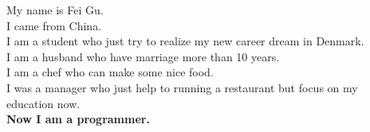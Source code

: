 
My name is Fei Gu.\\
I came from China.\\
I am a student who just try to realize my new career dream in Denmark.\\
I am a husband who have marriage more than 10 years.\\
I am a chef who can make some nice food.\\
I was a manager who just help to running a restaurant but focus on my education now.\\
\textbf{Now I am a programmer.}

